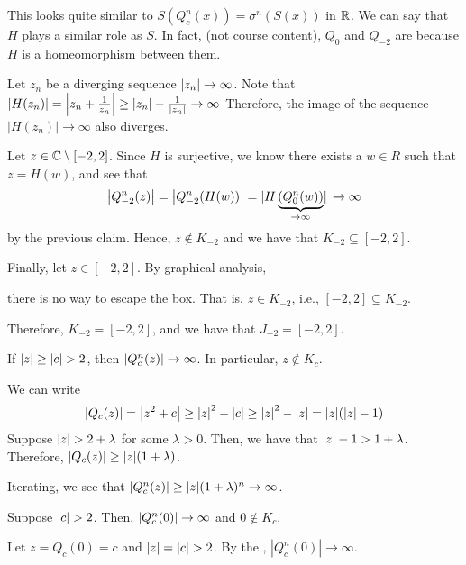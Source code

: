 \documentclass[class=pmath370,tikz,notes]{agony}
\begin{document}
\begin{sol}
  This looks quite similar to $S(Q_c^n(x)) = \sigma^n(S(x))$ in $\mathbb{R}$.
  We can say that $H$ plays a similar role as $S$.
  In fact, (not course content), $Q_0$ and $Q_{-2}$ are 
  because $H$ is a homeomorphism between them.

  Let $z_n$ be a diverging sequence $\abs{z_n} \to \infty$.
  Note that $\abs{H(z_n)} = \abs{z_n + \frac{1}{z_n}} \geq \abs{z_n} - \frac{1}{\abs{z_n}} \to \infty$
  Therefore, the image of the sequence $|H(z_n)| \to \infty$ also diverges.

  Let $z \in \mathbb{C} \setminus [-2, 2]$.
  Since $H$ is surjective, we know there exists a $w \in R$ such that $z=H(w)$,
  and see that
  \[
    \abs{Q_{-2}^n(z)}
    = \abs{Q_{-2}^n(H(w))}
    = \abs*{H\underbrace{(Q_0^n(w))}_{\to \infty}} \to \infty
  \]
  by the previous claim.
  Hence, $z \not\in K_{-2}$ and we have that $K_{-2} \subseteq [-2,2]$.

  Finally, let $z \in [-2, 2]$.
  By graphical analysis,
  \begin{center}
  \end{center}
  there is no way to escape the box.
  That is, $z \in K_{-2}$, i.e., $[-2,2] \subseteq K_{-2}$.

  Therefore, $K_{-2} = [-2, 2]$, and we have that $J_{-2} =[-2,2]$.
\end{sol}

\begin{prop}\label{prop:esc}
  If $\abs{z} \geq \abs{c} > 2$, then $\abs{Q_c^n(z)} \to \infty$.
  In particular, $z \not\in K_c$.
\end{prop}
\begin{prf}
  We can write
  \[ \abs{Q_c(z)} = \abs{z^2+c} \geq \abs{z}^2 - \abs{c} \geq \abs{z}^2 - \abs{z} = \abs{z}(\abs{z}-1) \]
  Suppose $\abs{z} > 2 + \lambda$ for some $\lambda > 0$.
  Then, we have that $\abs{z} - 1 > 1+\lambda$.
  Therefore, $\abs{Q_c(z)} \geq \abs{z}(1+\lambda)$.

  Iterating, we see that $\abs{Q_c^n(z)} \geq \abs{z}(1+\lambda)^n \to \infty$.
\end{prf}

\begin{corollary}\label{cor:esc2}
  Suppose $\abs{c} > 2$. Then, $\abs{Q_c^n(0)} \to \infty$ and $0 \not\in K_c$.
\end{corollary}
\begin{prf}
  Let $z = Q_c(0) = c$ and $\abs{z} = \abs{c} > 2$.
  By the , $|Q_c^n(0)| \to \infty$.
\end{prf}
\end{document}

